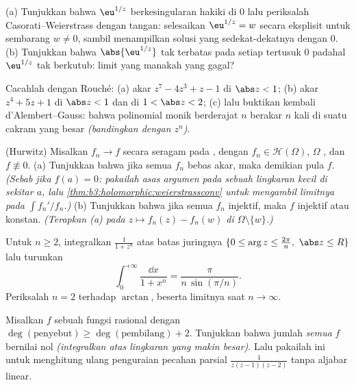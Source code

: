 \begin{exercise}[$\star\star$]\label{exo:b3:residues:6}
(a) Tunjukkan bahwa $\eu^{1/z}$ berkesingularan hakiki di $0$
lalu periksalah Casorati--Weierstrass dengan tangan: selesaikan $\eu^{1/z} =
w$ secara eksplisit untuk sembarang $w \neq 0$, sambil menampilkan solusi
yang sedekat-dekatnya dengan $0$.
(b) Tunjukkan bahwa $\abs{\eu^{1/z}}$ tak terbatas pada setiap
 tertusuk $0$ padahal $\eu^{1/z}$ tak berkutub:
limit yang manakah yang gagal?
\end{exercise}

\begin{exercise}[$\star\star$]\label{exo:b3:residues:7}
Cacahlah dengan Rouché:
(a) akar $z^7 - 4z^3 + z - 1$ di $\abs z < 1$;
(b) akar $z^4 + 5z + 1$ di $\abs z < 1$ dan di $1 <
\abs z < 2$;
(c) lalu buktikan kembali d'Alembert--Gauss: bahwa polinomial monik berderajat $n$
berakar $n$ kali di suatu cakram yang besar \emph{(bandingkan dengan
$z^n$)}.
\end{exercise}

\begin{exercise}[$\star\star\star$]\label{exo:b3:residues:8}
(Hurwitz) Misalkan $f_n \to f$ secara seragam pada , dengan $f_n \in
\mathcal H(\Omega)$, $\Omega$ , dan $f \not\equiv 0$.
(a) Tunjukkan bahwa jika semua $f_n$ bebas akar, maka demikian pula $f$.
\emph{(Sebab jika $f(a) = 0$: pakailah asas argumen pada sebuah lingkaran kecil
di sekitar $a$, lalu \cref{thm:b3:holomorphic:weierstrassconv} untuk
mengambil limitnya pada $\int f_n'/f_n$.)}
(b) Tunjukkan bahwa jika semua $f_n$ injektif, maka $f$ injektif atau
konstan. \emph{(Terapkan (a) pada $z \mapsto f_n(z) - f_n(w)$ di
$\Omega\setminus\{w\}$.)}
\end{exercise}

\begin{exercise}[$\star\star\star$]\label{exo:b3:residues:9}
Untuk $n \geq 2$, integralkan $\frac1{1 + z^n}$ atas batas
juringnya $\{0 \leq \arg z \leq \frac{2\pi}n,\ \abs z
\leq R\}$ lalu turunkan
\[
\int_0^{+\infty}\frac{\dd x}{1 + x^n} =
\frac{\pi}{n\,\sin(\pi/n)} .
\]
Periksalah $n = 2$ terhadap $\arctan$, beserta limitnya saat $n \to
\infty$.
\end{exercise}

\begin{exercise}[$\star\star$]\label{exo:b3:residues:10}
Misalkan $f$ sebuah fungsi rasional dengan $\deg(\text{penyebut})
\geq \deg(\text{pembilang}) + 2$. Tunjukkan bahwa jumlah
\emph{semua}  $f$ bernilai nol \emph{(integralkan atas
lingkaran yang makin besar)}. Lalu pakailah ini untuk menghitung ulang penguraian
pecahan parsial $\frac1{z(z-1)(z-2)}$ tanpa aljabar
linear.
\end{exercise}

